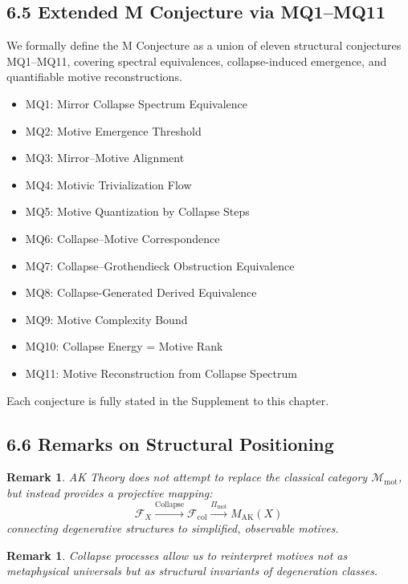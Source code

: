 \documentclass[11pt]{article}
\newtheorem{remark}[theorem]{Remark}
\begin{document}
\subsection{6.5 Extended M Conjecture via MQ1–MQ11}

We formally define the M Conjecture as a union of eleven structural conjectures MQ1–MQ11, covering spectral equivalences, collapse-induced emergence, and quantifiable motive reconstructions.

\begin{itemize}
    \item MQ1: Mirror Collapse Spectrum Equivalence
    \item MQ2: Motive Emergence Threshold
    \item MQ3: Mirror–Motive Alignment
    \item MQ4: Motivic Trivialization Flow
    \item MQ5: Motive Quantization by Collapse Steps
    \item MQ6: Collapse–Motive Correspondence
    \item MQ7: Collapse–Grothendieck Obstruction Equivalence
    \item MQ8: Collapse-Generated Derived Equivalence
    \item MQ9: Motive Complexity Bound
    \item MQ10: Collapse Energy = Motive Rank
    \item MQ11: Motive Reconstruction from Collapse Spectrum
\end{itemize}

Each conjecture is fully stated in the Supplement to this chapter.

\subsection{6.6 Remarks on Structural Positioning}

\begin{remark}
AK Theory does not attempt to replace the classical category $\mathcal{M}_{\mathrm{mot}}$, but instead provides a projective mapping:
\[
\mathcal{F}_X \xrightarrow{\text{Collapse}} \mathcal{F}_{\mathrm{col}} \xrightarrow{\Pi_{\mathrm{mot}}} M_{\mathrm{AK}}(X)
\]
connecting degenerative structures to simplified, observable motives.
\end{remark}

\begin{remark}
Collapse processes allow us to reinterpret motives not as metaphysical universals but as structural invariants of degeneration classes.
\end{remark}
\end{document}
